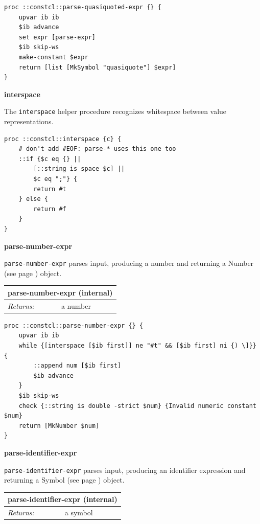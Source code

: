\documentclass[twoside,9pt]{report}
\begin{document}
\noindent\makebox[\linewidth]{\rule{\linewidth}{0.4pt}}
\begin{lstlisting}
proc ::constcl::parse-quasiquoted-expr {} {
    upvar ib ib
    $ib advance
    set expr [parse-expr]
    $ib skip-ws
    make-constant $expr
    return [list [MkSymbol "quasiquote"] $expr]
}
\end{lstlisting}
\noindent\makebox[\linewidth]{\rule{\linewidth}{0.4pt}}

\textbf{interspace}


The \texttt{interspace} helper procedure recognizes whitespace between value representations.

\noindent\makebox[\linewidth]{\rule{\linewidth}{0.4pt}}
\begin{lstlisting}
proc ::constcl::interspace {c} {
    # don't add #EOF: parse-* uses this one too
    ::if {$c eq {} ||
        [::string is space $c] ||
        $c eq ";"} {
        return #t
    } else {
        return #f
    }
}
\end{lstlisting}
\noindent\makebox[\linewidth]{\rule{\linewidth}{0.4pt}}

\textbf{parse-number-expr}


\texttt{parse-number-expr} parses input, producing a number and returning a Number (see page \pageref{numbers}) object.

\begin{tabular}{ |l l| }
\hline
\multicolumn{2}{|l|}{parse-number-expr (internal)} \\
\hline
\textit{Returns:} & a number \\
\hline
\end{tabular}

\noindent\makebox[\linewidth]{\rule{\linewidth}{0.4pt}}
\begin{lstlisting}
proc ::constcl::parse-number-expr {} {
    upvar ib ib
    while {[interspace [$ib first]] ne "#t" && [$ib first] ni {) \]}} {
        ::append num [$ib first]
        $ib advance
    }
    $ib skip-ws
    check {::string is double -strict $num} {Invalid numeric constant $num}
    return [MkNumber $num]
}
\end{lstlisting}
\noindent\makebox[\linewidth]{\rule{\linewidth}{0.4pt}}

\textbf{parse-identifier-expr}


\texttt{parse-identifier-expr} parses input, producing an identifier expression and returning a Symbol (see page \pageref{symbols}) object.

\begin{tabular}{ |l l| }
\hline
\multicolumn{2}{|l|}{parse-identifier-expr (internal)} \\
\hline
\textit{Returns:} & a symbol \\
\hline
\end{tabular}
\end{document}

